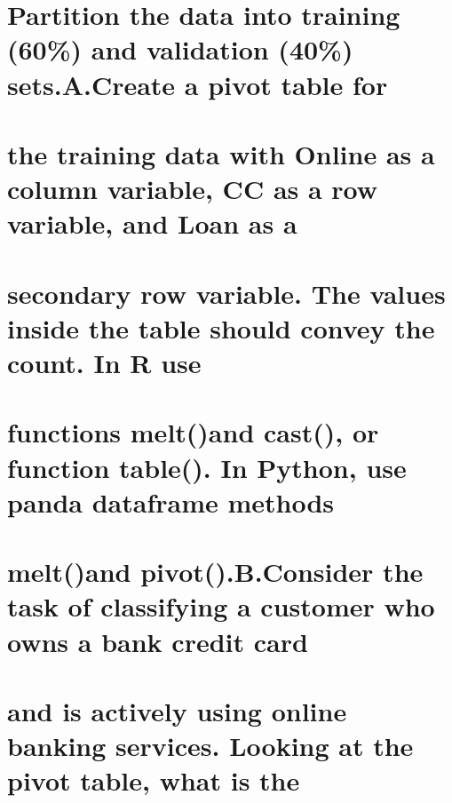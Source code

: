 \documentclass[
]{article}
\author{}
\date{\vspace{-2.5em}}
\begin{document}
\hypertarget{partition-the-data-into-training-60-and-validation-40-sets.a.create-a-pivot-table-for}{%
\section{Partition the data into training (60\%) and validation (40\%)
sets.A.Create a pivot table
for}\label{partition-the-data-into-training-60-and-validation-40-sets.a.create-a-pivot-table-for}}

\hypertarget{the-training-data-with-online-as-a-column-variable-cc-as-a-row-variable-and-loan-as-a}{%
\section{the training data with Online as a column variable, CC as a row
variable, and Loan as
a}\label{the-training-data-with-online-as-a-column-variable-cc-as-a-row-variable-and-loan-as-a}}

\hypertarget{secondary-row-variable.-the-values-inside-the-table-should-convey-the-count.-in-r-use}{%
\section{secondary row variable. The values inside the table should
convey the count. In R
use}\label{secondary-row-variable.-the-values-inside-the-table-should-convey-the-count.-in-r-use}}

\hypertarget{functions-meltand-cast-or-function-table.-in-python-use-panda-dataframe-methods}{%
\section{functions melt()and cast(), or function table(). In Python, use
panda dataframe
methods}\label{functions-meltand-cast-or-function-table.-in-python-use-panda-dataframe-methods}}

\hypertarget{meltand-pivot.b.consider-the-task-of-classifying-a-customer-who-owns-a-bank-credit-card}{%
\section{melt()and pivot().B.Consider the task of classifying a customer
who owns a bank credit
card}\label{meltand-pivot.b.consider-the-task-of-classifying-a-customer-who-owns-a-bank-credit-card}}

\hypertarget{and-is-actively-using-online-banking-services.-looking-at-the-pivot-table-what-is-the}{%
\section{and is actively using online banking services. Looking at the
pivot table, what is
the}\label{and-is-actively-using-online-banking-services.-looking-at-the-pivot-table-what-is-the}}
\end{document}

